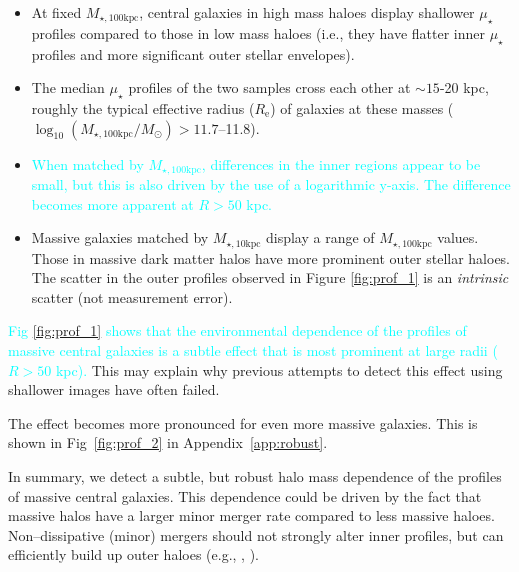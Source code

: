 \documentclass[a4paper,fleqn,usenatbib]{mnras}
\def\minn{{$M_{\star,10\mathrm{kpc}}$}}
\def\mtot{{$M_{\star,100\mathrm{kpc}}$}}
\def\logmtot{{$\log_{10} (M_{\star,100\mathrm{kpc}}/M_{\odot})$}}
\def\mden{{$\mu_{\star}$}}
\newcommand{\song}[1]{\textcolor{cyan}{#1}}
\begin{document}
    \begin{itemize}
        
        \item At fixed \mtot{}, central galaxies in high mass haloes display shallower 
            \mden{} profiles compared to those in low mass haloes (i.e., they have 
            flatter inner \mden{} profiles and more significant outer stellar 
            envelopes). 
            
        \item The median \mden{} profiles of the two samples cross 
            each other at ${\sim} 15$-20 kpc, roughly the typical effective radius 
            ($R_{\mathrm{e}}$) of galaxies at these masses (\logmtot{}$>11.7$--11.8).  
                        
        \item \song{
            When matched by \mtot{}, differences in the inner regions appear 
            to be small, but this is also driven by the use of a logarithmic y-axis. 
            The difference becomes more apparent at $R>50$ kpc.  
            }
                                
        \item Massive galaxies matched by \minn{} display a range of \mtot{} values. 
            Those in massive dark matter halos have more prominent outer stellar haloes. 
            The scatter in the outer profiles observed in Figure \ref{fig:prof_1} is 
            an \textit{intrinsic} scatter (not measurement error).     
                            
    \end{itemize}

    \song{
    Fig \ref{fig:prof_1} shows that the environmental dependence of the profiles of 
    massive central galaxies is a subtle effect that is most prominent at large radii 
    ($R>50$ kpc).
    } 
    This may explain why previous attempts to detect this effect using shallower images 
    have often failed. 
    
    The effect becomes more pronounced for even more massive galaxies. 
    This is shown in Fig~\ref{fig:prof_2} in Appendix~\ref{app:robust}.
    
    In summary, we detect a subtle, but robust halo mass dependence of the profiles of 
    massive central galaxies. 
    This dependence could be driven by the fact that massive halos have a larger minor 
    merger rate compared to less massive haloes. 
    Non--dissipative (minor) mergers should not strongly alter inner profiles, but can
    efficiently build up outer haloes (e.g., \citealt{Hilz2013}, \citealt{Oogi2013}).
      
\end{document}
